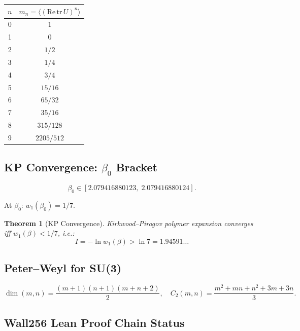 \documentclass[12pt,letterpaper]{article}
\newtheorem{theorem}{Theorem}[section]
\begin{document}
\begin{center}
\begin{tabular}{cc}
\toprule
$n$ & $m_n = \langle(\mathrm{Re}\,\mathrm{tr}\,U)^n\rangle$ \\
\midrule
0 & $1$ \\
1 & $0$ \\
2 & $1/2$ \\
3 & $1/4$ \\
4 & $3/4$ \\
5 & $15/16$ \\
6 & $65/32$ \\
7 & $35/16$ \\
8 & $315/128$ \\
9 & $2205/512$ \\
\bottomrule
\end{tabular}
\end{center}

\subsection{KP Convergence: $\beta_0$ Bracket}

\begin{equation}
  \beta_0 \in [2.079416880123,\; 2.079416880124].
  \label{eq:beta0_bracket}
\end{equation}

At $\beta_0$: $w_1(\beta_0) = 1/7$.

\begin{theorem}[KP Convergence]
  Kirkwood--Pirogov polymer expansion converges iff
  $w_1(\beta) < 1/7$, i.e.:
  \begin{equation}
    I = -\ln w_1(\beta) > \ln 7 = 1.94591\ldots
    \label{eq:KP}
  \end{equation}
\end{theorem}

\subsection{Peter--Weyl for SU(3)}

\begin{equation}
  \dim(m,n) = \frac{(m+1)(n+1)(m+n+2)}{2},\quad
  C_2(m,n) = \frac{m^2+mn+n^2+3m+3n}{3}.
  \label{eq:PW}
\end{equation}

\subsection{Wall256 Lean Proof Chain Status}
\end{document}
